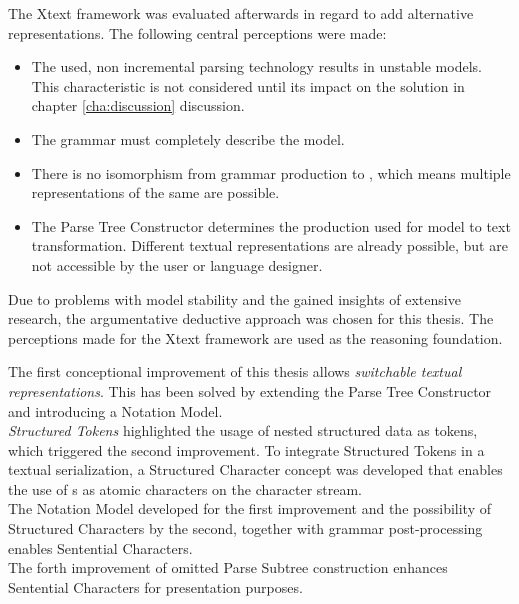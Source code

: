 The Xtext framework was evaluated afterwards in regard to add alternative representations.
The following central perceptions were made:
\begin{itemize}
	\item The used, non incremental parsing technology results in unstable models. This characteristic is not considered until its impact on the solution in chapter \ref{cha:discussion} discussion.
	\item The grammar must completely describe the model. 
	\item There is no isomorphism from grammar production to , which means multiple representations of the same  are possible.
	\item The Parse Tree Constructor determines the production used for model to text transformation. Different textual representations are already possible, but are not accessible by the user or language designer. \\
\end{itemize}

Due to problems with model stability and the gained insights of extensive research, the argumentative deductive approach was chosen for this thesis. The perceptions made for the Xtext framework are used as the reasoning foundation. 

The first conceptional improvement of this thesis allows \emph{switchable textual representations}. This has been solved by extending the Parse Tree Constructor and introducing a Notation Model.\\

\emph{Structured Tokens} highlighted the usage of nested structured data as tokens, which triggered the second improvement. To integrate Structured Tokens in a textual serialization, a Structured Character concept was developed that enables the use of s as atomic characters on the character stream. \\

The Notation Model developed for the first improvement and the possibility of Structured Characters by the second, together with grammar post-processing enables Sentential Characters. \\

The forth improvement of omitted Parse Subtree construction enhances Sentential Characters for presentation purposes.
